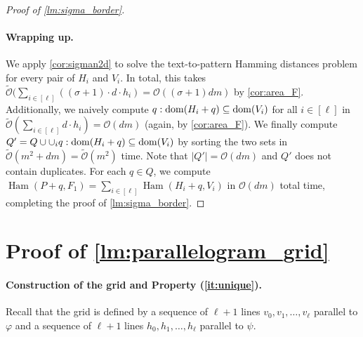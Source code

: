 \documentclass[11pt, letterpaper]{article}
\theoremstyle{plain}
\theoremstyle{definition}
\theoremstyle{remark}
\renewcommand{\O}{\mathcal{O}}
\newcommand{\tO}{\tilde{\mathcal{O}}}
\renewcommand{\phi}{\varphi}
\DeclareMathOperator*{\Ham}{Ham}
\newcommand{\absolute}[1]{\left\lvert#1\right\rvert}
\begin{document}
\begin{proof}[{Proof of \cref{lm:sigma_border}}]
\paragraph*{Wrapping up.}
We apply \cref{cor:sigman2d} to solve the text-to-pattern Hamming distances problem for every pair of $H_i$ and $V_i$. In total, this takes $\tO(\sum_{i \in [\ell]} ((\sigma+1) \cdot d \cdot h_i) = \O((\sigma+1) dm)$ by \cref{cor:area_F}. Additionally, we naively compute ${q : \operatorname*{dom}(H_i+q) \subseteq \operatorname*{dom}(V_i)}$ for all $i \in [\ell]$ in $\tO(\sum_{i \in [\ell]} d \cdot h_i) = \O(dm)$ (again, by \cref{cor:area_F}). We finally compute $Q' = Q \cup \cup_i {q : \operatorname*{dom}(H_i+q) \subseteq \operatorname*{dom}(V_i)}$ by sorting the two sets in $\tO(m^2 + dm) = \tO(m^2)$ time. Note that $\absolute{Q'} = \O(dm)$ and $Q'$ does not contain duplicates. For each $q \in Q$, we compute $\Ham(P + q, F_1) = \sum_{i \in [\ell]} \Ham(H_i + q, V_i)$ in $\O(dm)$ total time, completing the proof of \cref{lm:sigma_border}.
\end{proof}





\appendix
\section{Proof of \cref{lm:parallelogram_grid}}
\label{app:parallelogram_grid}
\paragraph*{Construction of the grid and Property (\ref{it:unique}).}
Recall that the grid is defined by a sequence of $\ell+1$ lines $v_0, v_1, \ldots, v_\ell$ parallel to $\phi$ and a sequence of $\ell+1$ lines $h_0, h_1, \ldots, h_\ell$ parallel to $\psi$. 
\end{document}
